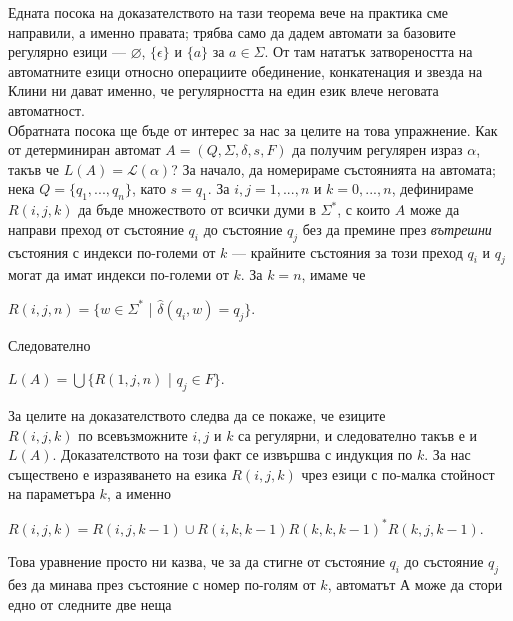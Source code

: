 \documentclass{article}
\begin{document}
    \hspace{15pt} Едната посока на доказателството на тази теорема вече на практика сме направили, а
    именно правата; трябва само да дадем автомати за базовите регулярно езици — $\varnothing$,
    $\{\epsilon\}$ и $\{a\}$ за $a \in \Sigma$. От там нататък затвореността на автоматните
    езици относно операциите обединение, конкатенация и звезда на Клини ни дават именно,
    че регулярността на един език влече неговата автоматност. \\
    \hspace{15pt} Обратната посока ще бъде от интерес за нас за целите на това упражнение.
    Как от детерминиран автомат $A = (Q,\Sigma,\delta,s,F)$ да получим регулярен израз $\alpha$, такъв че 
    $L(A) = \mathscr{L}(\alpha)$? За начало, да номерираме състоянията на автомата; нека $Q = \{q_1,...,q_n\}$, 
    като $s = q_1$. За $i,j = 1,...,n$ и $k = 0,...,n$, дефинираме $R(i,j,k)$ да бъде
    множеството от всички думи в $\Sigma^*$, с които $A$ може да направи преход от 
    състояние $q_i$ до състояние $q_j$ без да премине през \textit{вътрешни} състояния
    с индекси по-големи от $k$ — крайните състояния за този преход $q_i$ и $q_j$ могат да 
    имат индекси по-големи от $k$. За $k = n$, имаме че 
    \begin{center}
        $R(i,j,n) = \{w \in \Sigma^*$ | $\hat{\delta}(q_i,w) = q_j\}$.
    \end{center}
    Следователно
    \begin{center}
        $L(A) = \bigcup\{R(1,j,n)$ | $q_j \in F\}$.
    \end{center}
    \hspace{15pt} За целите на доказателството следва да се покаже, че езиците \\ $R(i,j,k)$
    по всевъзможните $i,j$ и $k$ са регулярни, и следователно такъв е и $L(A)$. Доказателството
    на този факт се извършва с индукция по $k$. За нас съществено е изразяването на
    езика $R(i,j,k)$ чрез езици с по-малка стойност на параметъра $k$, а именно
    \begin{center}
        $R(i,j,k) = R(i,j,k-1) \cup R(i,k,k-1)R(k,k,k-1)^*R(k,j,k-1)$.
    \end{center}

    Това уравнение просто ни казва, че за да стигне от състояние $q_i$ до състояние
    $q_j$ без да минава през състояние с номер по-голям от $k$, автоматът А може да 
    стори едно от следните две неща
    
\end{document}
